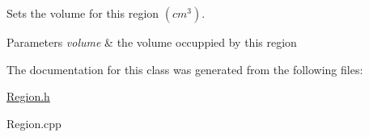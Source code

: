 Sets the volume for this region $ (cm^3) $. 


\begin{DoxyParams}{Parameters}
{\em volume} & the volume occuppied by this region \\
\hline
\end{DoxyParams}


The documentation for this class was generated from the following files\-:\begin{DoxyCompactItemize}
\item 
\hyperlink{Region_8h}{Region.\-h}\item 
Region.\-cpp\end{DoxyCompactItemize}
